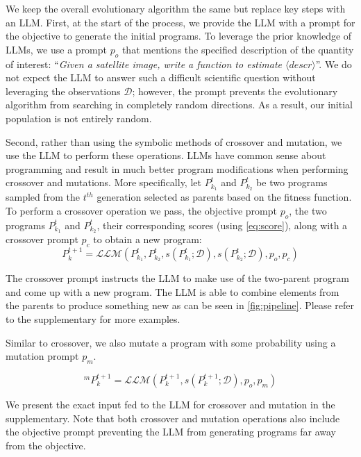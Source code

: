 We keep the overall evolutionary algorithm the same but replace key steps with an LLM.
First, at the start of the process, we provide the LLM with a prompt for the objective to generate the initial programs.
To leverage the prior knowledge of LLMs, we use a prompt $p_o$ that mentions the specified description of the quantity of interest:  ``\emph{Given a satellite image, write a function to estimate $\langle descr \rangle$}''. 
We do not expect the LLM to answer such a difficult scientific question without leveraging the observations $\mathcal{D}$; however, the prompt prevents the evolutionary algorithm from searching in completely random directions. 
As a result, our initial population is not entirely random.

Second, rather than using the symbolic methods of crossover and mutation, we use the LLM to perform these operations.
LLMs have common sense about programming and result in much better program modifications when performing crossover and mutations. 
More specifically, let $P^t_{k_1}$ and $P^t_{k_2}$ be two programs sampled from the $t^{th}$ generation selected as parents based on the fitness function. 
To perform a crossover operation we pass, the objective prompt $p_o$, the two programs $P^t_{k_1}$ and $P^t_{k_2}$, their corresponding scores (using \cref{eq:score}), along with a crossover prompt $p_c$ to obtain a new program:
\begin{equation}
P^{t+1}_{k} = \mathcal{LLM}(P^t_{k_1}, P^t_{k_2}, s(P^t_{k_1}; \mathcal{D}), s(P^t_{k_2}; \mathcal{D}), p_o, p_c)    
\end{equation}

The crossover prompt instructs the LLM to make use of the two-parent program and come up with a new program. 
The LLM is able to combine elements from the parents to produce something new as can be seen in \cref{fig:pipeline}. Please refer to the supplementary 
for more examples.

Similar to crossover, we also mutate a program with some probability using a mutation prompt $p_m$. 

\begin{equation}
^{m}P_k^{t+1} = \mathcal{LLM}(P_k^{t+1}, s(P_k^{t+1}; \mathcal{D}), p_o, p_m)
\end{equation}

We present the exact input fed to the LLM for crossover and mutation in the supplementary. Note that both crossover and mutation operations also include the objective prompt preventing the LLM from generating programs far away from the objective. %


